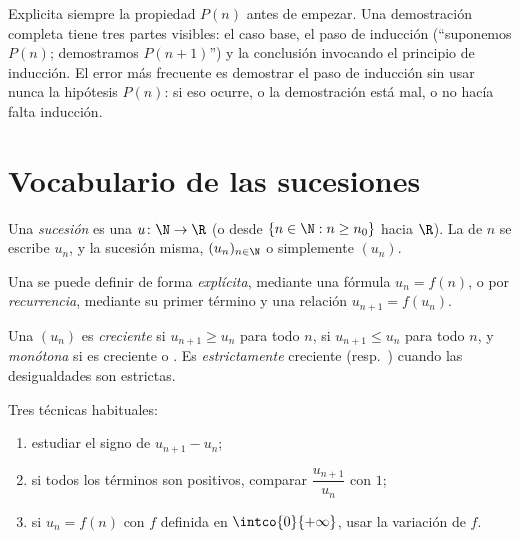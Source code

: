 \begin{method}\label{met:g12:seq:induction}
Explicita siempre la propiedad $P(n)$ antes de empezar. Una demostración
completa tiene tres partes visibles: el caso base, el paso de inducción
(``suponemos $P(n)$; demostramos $P(n+1)$'') y la conclusión invocando el
principio de inducción. El error más frecuente es demostrar el paso de
inducción sin usar nunca la hipótesis $P(n)$: si eso ocurre, o la
demostración está mal, o no hacía falta inducción.
\end{method}

\section{Vocabulario de las sucesiones}

\begin{definition}[Sucesión]\label{def:g12:seq:sequence}
Una \emph{sucesión} es una  $u \colon \N \to \R$ (o
desde $\{n \in \N : n \geq n_0\}$ hacia $\R$). La  de $n$ se escribe
$u_n$, y la sucesión misma, $(u_n)_{n\in\N}$ o simplemente $(u_n)$.
\end{definition}

Una  se puede definir de forma \emph{explícita}, mediante una
fórmula $u_n = f(n)$, o por \emph{recurrencia}, mediante su primer término
y una relación $u_{n+1} = f(u_n)$.

\begin{definition}[Monotonía]\label{def:g12:seq:monotonic}
Una  $(u_n)$ es \emph{creciente} si
$u_{n+1} \geq u_n$ para todo $n$, \emph{} si
$u_{n+1} \leq u_n$ para todo $n$, y \emph{monótona} si es creciente o
. Es \emph{estrictamente} creciente (resp.\ ) cuando
las desigualdades son estrictas.
\end{definition}

\begin{method}\label{met:g12:seq:monotonicity}
Tres técnicas habituales:
\begin{enumerate}
  \item estudiar el signo de $u_{n+1} - u_n$;
  \item si todos los términos son positivos, comparar
        $\dfrac{u_{n+1}}{u_n}$ con $1$;
  \item si $u_n = f(n)$ con $f$ definida en $\intco{0}{+\infty}$, usar la
        variación de $f$.
\end{enumerate}
\end{method}

